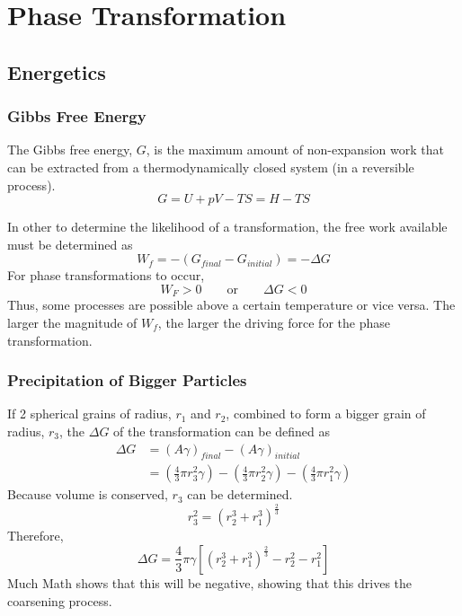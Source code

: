 \section{Phase Transformation} %
\label{sec:phase_transformation}

\subsection{Energetics} %
\label{sub:energetics}

\subsubsection{Gibbs Free Energy}
The Gibbs free energy, $G$, is the maximum amount of non-expansion work that can be extracted from a thermodynamically closed system (in a reversible process).
\begin{equation}
  G = U + pV - TS = H -TS
\end{equation}

In other to determine the likelihood of a transformation, the free work available must be determined as
\begin{equation}
  W_f = -(G_{final} - G_{initial}) = - \Delta G
\end{equation}
For phase transformations to occur,
\begin{equation}
  W_F > 0 \qquad\text{or}\qquad \Delta G < 0
\end{equation}
Thus, some processes are possible above a certain temperature or vice versa. The larger the magnitude of $W_f$, the larger the driving force for the phase transformation.

\subsubsection{Precipitation of Bigger Particles}
If 2 spherical grains of radius, $r_1$ and $r_2$, combined to form a bigger grain of radius, $r_3$, the $\Delta G$ of the transformation can be defined as
\begin{align}
  \Delta G &= (A\gamma)_{final} - (A\gamma)_{initial} \\
  &= (\frac{4}{3}\pi r_3^2\gamma) - (\frac{4}{3}\pi r_2^2\gamma) - (\frac{4}{3}\pi r_1^2\gamma)
\end{align}
Because volume is conserved, $r_3$ can be determined.
\begin{equation}
  r_3^2 = (r_2^3+r_1^3)^\frac{2}{3}
\end{equation}
Therefore,
\begin{equation}
  \Delta G = \frac{4}{3}\pi\gamma \left[(r_2^3+r_1^3)^\frac{2}{3} - r^2_2 - r^2_1 \right]
\end{equation}
Much Math shows that this will be negative, showing that this drives the coarsening process.
